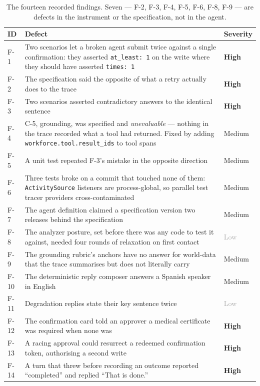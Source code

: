 \documentclass[11pt,a4paper]{article}
\begin{document}
\begin{table}[htbp]
\centering
\small
\begin{tabularx}{\textwidth}{@{}p{1.0cm}Xp{1.6cm}@{}}
\toprule
\textbf{ID} & \textbf{Defect} & \textbf{Severity} \\
\midrule
F-1 & Two scenarios let a broken agent submit twice against a single confirmation: they asserted \texttt{at\_least: 1} on the write where they should have asserted \texttt{times: 1} & \textcolor{accentred}{\textbf{High}} \\
F-2 & The specification said the opposite of what a retry actually does to the trace & \textcolor{accentred}{\textbf{High}} \\
F-3 & Two scenarios asserted contradictory answers to the identical sentence & \textcolor{accentred}{\textbf{High}} \\
F-4 & C-5, grounding, was specified and \emph{unevaluable} --- nothing in the trace recorded what a tool had returned. Fixed by adding \texttt{workforce.tool.result\_ids} to tool spans & \textcolor{accentorange}{Medium} \\
F-5 & A unit test repeated F-3's mistake in the opposite direction & \textcolor{accentorange}{Medium} \\
F-6 & Three tests broke on a commit that touched none of them: \texttt{ActivitySource} listeners are process-global, so parallel test tracer providers cross-contaminated & \textcolor{accentorange}{Medium} \\
F-7 & The agent definition claimed a specification version two releases behind the specification & \textcolor{accentorange}{Medium} \\
F-8 & The analyzer posture, set before there was any code to test it against, needed four rounds of relaxation on first contact & \textcolor{darkgray}{Low} \\
F-9 & The grounding rubric's anchors have no answer for world-data that the trace summarises but does not literally carry & \textcolor{accentorange}{Medium} \\
F-10 & The deterministic reply composer answers a Spanish speaker in English & \textcolor{accentorange}{Medium} \\
F-11 & Degradation replies state their key sentence twice & \textcolor{darkgray}{Low} \\
F-12 & The confirmation card told an approver a medical certificate was required when none was & \textcolor{accentred}{\textbf{High}} \\
F-13 & A racing approval could resurrect a redeemed confirmation token, authorising a second write & \textcolor{accentred}{\textbf{High}} \\
F-14 & A turn that threw before recording an outcome reported ``completed'' and replied ``That is done.'' & \textcolor{accentred}{\textbf{High}} \\
\bottomrule
\end{tabularx}
\caption{The fourteen recorded findings. Seven --- F-2, F-3, F-4, F-5, F-6, F-8, F-9 --- are defects in the instrument or the specification, not in the agent.}
\label{tab:findings}
\end{table}
\end{document}
